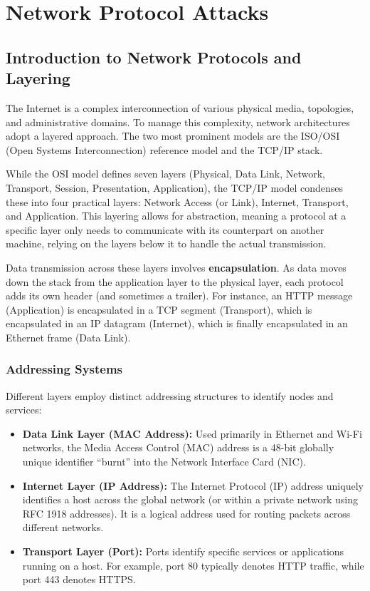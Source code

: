\chapter{Network Protocol Attacks}


\section{Introduction to Network Protocols and Layering}

The Internet is a complex interconnection of various physical media, topologies, and administrative domains. To manage this complexity, network architectures adopt a layered approach. The two most prominent models are the ISO/OSI (Open Systems Interconnection) reference model and the TCP/IP stack.

While the OSI model defines seven layers (Physical, Data Link, Network, Transport, Session, Presentation, Application), the TCP/IP model condenses these into four practical layers: Network Access (or Link), Internet, Transport, and Application. This layering allows for abstraction, meaning a protocol at a specific layer only needs to communicate with its counterpart on another machine, relying on the layers below it to handle the actual transmission.

Data transmission across these layers involves \textbf{encapsulation}. As data moves down the stack from the application layer to the physical layer, each protocol adds its own header (and sometimes a trailer). For instance, an HTTP message (Application) is encapsulated in a TCP segment (Transport), which is encapsulated in an IP datagram (Internet), which is finally encapsulated in an Ethernet frame (Data Link).

\subsection{Addressing Systems}

Different layers employ distinct addressing structures to identify nodes and services:
\begin{itemize}
    \item \textbf{Data Link Layer (MAC Address):} Used primarily in Ethernet and Wi-Fi networks, the Media Access Control (MAC) address is a 48-bit globally unique identifier ``burnt'' into the Network Interface Card (NIC).
    \item \textbf{Internet Layer (IP Address):} The Internet Protocol (IP) address uniquely identifies a host across the global network (or within a private network using RFC 1918 addresses). It is a logical address used for routing packets across different networks.
    \item \textbf{Transport Layer (Port):} Ports identify specific services or applications running on a host. For example, port 80 typically denotes HTTP traffic, while port 443 denotes HTTPS.
\end{itemize}


